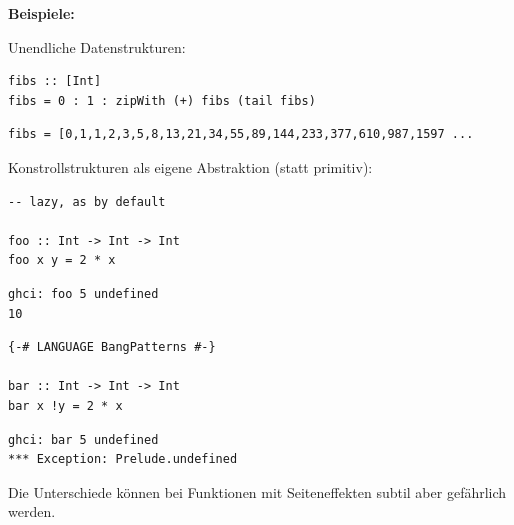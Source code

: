 \documentclass[unknownkeysallowed]{beamer}
\begin{document}
\begin{frame}[fragile]

\Large\textbf{Beispiele:} \normalsize \smallskip
\pause

Unendliche Datenstrukturen:

\begin{verbatim}
fibs :: [Int]
fibs = 0 : 1 : zipWith (+) fibs (tail fibs)
\end{verbatim}

\pause

\begin{verbatim}
fibs = [0,1,1,2,3,5,8,13,21,34,55,89,144,233,377,610,987,1597 ...
\end{verbatim}

\smallskip
\pause

Konstrollstrukturen als eigene Abstraktion (statt primitiv):
\pause

\begin{multicols}{2}

\begin{verbatim}
-- lazy, as by default

foo :: Int -> Int -> Int
foo x y = 2 * x
\end{verbatim}

\pause

\begin{verbatim}
ghci: foo 5 undefined
10
\end{verbatim}

\pause
\columnbreak

\begin{verbatim}
{-# LANGUAGE BangPatterns #-}

bar :: Int -> Int -> Int
bar x !y = 2 * x
\end{verbatim}

\pause

\begin{verbatim}
ghci: bar 5 undefined
*** Exception: Prelude.undefined
\end{verbatim}
\end{multicols}
\pause

Die Unterschiede können bei Funktionen mit Seiteneffekten subtil aber gefährlich werden.

\end{frame}

\end{document}
